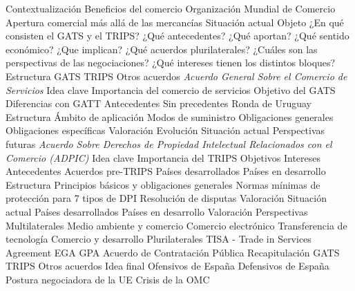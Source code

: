 \documentclass{nuevotema}
\begin{document}
\begin{esquema}[enumerate]
	\1[] 
		\2 Contextualización
			\3 Beneficios del comercio
			\3 Organización Mundial de Comercio
			\3 Apertura comercial más allá de las mercancías
			\3 Situación actual
		\2 Objeto
			\3 ¿En qué consisten el GATS y el TRIPS?
			\3 ¿Qué antecedentes?
			\3 ¿Qué aportan?
			\3 ¿Qué sentido económico?
			\3 ¿Que implican?
			\3 ¿Qué acuerdos plurilaterales?
			\3 ¿Cuáles son las perspectivas de las negociaciones?
			\3 ¿Qué intereses tienen los distintos bloques?
		\2 Estructura
			\3 GATS
			\3 TRIPS
			\3 Otros acuerdos
	\1  \textit{Acuerdo General Sobre el Comercio de Servicios}
		\2 Idea clave
			\3 Importancia del comercio de servicios
			\3 Objetivo del GATS
			\3 Diferencias con GATT
		\2 Antecedentes
			\3 Sin precedentes
			\3 Ronda de Uruguay
		\2 Estructura
			\3 Ámbito de aplicación
			\3 Modos de suministro
			\3 Obligaciones generales
			\3 Obligaciones específicas
		\2 Valoración
			\3 Evolución
			\3 Situación actual
			\3 Perspectivas futuras
	\1  \textit{Acuerdo Sobre Derechos de Propiedad Intelectual Relacionados con el Comercio (ADPIC)}
		\2 Idea clave
			\3 Importancia del TRIPS
			\3 Objetivos
			\3 Intereses
		\2 Antecedentes
			\3 Acuerdos pre-TRIPS
			\3 Países desarrollados
			\3 Países en desarrollo
		\2 Estructura
			\3 Principios básicos y obligaciones generales
			\3 Normas mínimas de protección para 7 tipos de DPI
			\3 Resolución de disputas
		\2 Valoración
			\3 Situación actual
			\3 Países desarrollados
			\3 Países en desarrollo
			\3 Valoración
			\3 Perspectivas
	\1 
		\2 Multilaterales
			\3 Medio ambiente y comercio
			\3 Comercio electrónico
			\3 Transferencia de tecnología
			\3 Comercio y desarrollo
		\2 Plurilaterales
			\3 TISA - Trade in Services Agreement
			\3 EGA
			\3 GPA Acuerdo de Contratación Pública
	\1[] 
		\2 Recapitulación
			\3 GATS
			\3 TRIPS
			\3 Otros acuerdos
		\2 Idea final
			\3 Ofensivos de España
			\3 Defensivos de España
			\3 Postura negociadora de la UE
			\3 Crisis de la OMC

\end{esquema}

\esquemalargo
\end{document}
